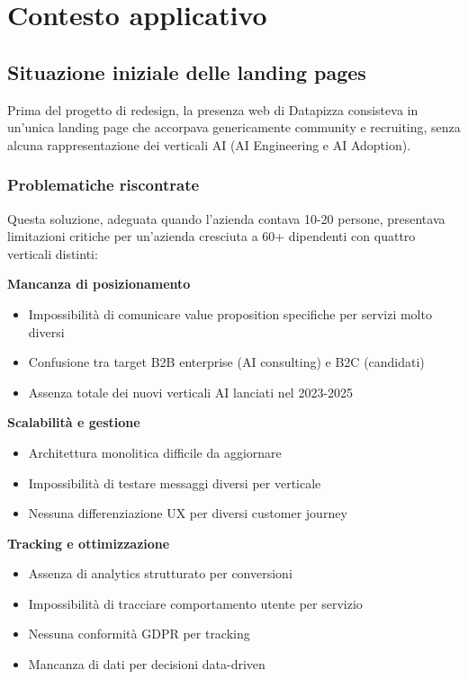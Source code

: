 \chapter{Contesto applicativo}

\section{Situazione iniziale delle landing pages}
Prima del progetto di redesign, la presenza web di Datapizza consisteva in un'unica landing page che accorpava genericamente community e recruiting, senza alcuna rappresentazione dei verticali AI (AI Engineering e AI Adoption).

\subsection{Problematiche riscontrate}
Questa soluzione, adeguata quando l'azienda contava 10-20 persone, presentava limitazioni critiche per un'azienda cresciuta a 60+ dipendenti con quattro verticali distinti:

\textbf{Mancanza di posizionamento}
\begin{itemize}
  \item Impossibilità di comunicare value proposition specifiche per servizi molto diversi
  \item Confusione tra target B2B enterprise (AI consulting) e B2C (candidati)
  \item Assenza totale dei nuovi verticali AI lanciati nel 2023-2025
\end{itemize}

\textbf{Scalabilità e gestione}
\begin{itemize}
  \item Architettura monolitica difficile da aggiornare
  \item Impossibilità di testare messaggi diversi per verticale
  \item Nessuna differenziazione UX per diversi customer journey
\end{itemize}

\textbf{Tracking e ottimizzazione}
\begin{itemize}
  \item Assenza di analytics strutturato per conversioni
  \item Impossibilità di tracciare comportamento utente per servizio
  \item Nessuna conformità GDPR per tracking
  \item Mancanza di dati per decisioni data-driven
\end{itemize}

